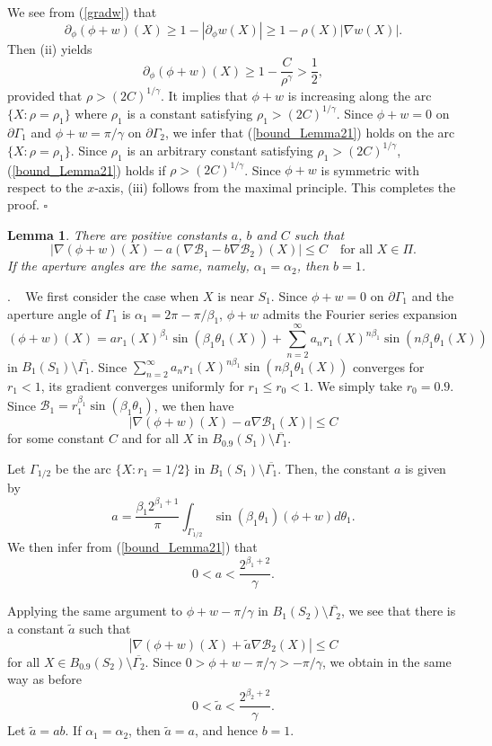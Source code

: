 \documentclass[11pt,a4paper]{article}
\numberwithin{equation}{section}
\newtheorem{lem}[thm]{Lemma}
\newcommand{\qed}{\hfill \ensuremath{\square}}
\newcommand{\pf}{\noindent {\sl Proof}. \ }
\newcommand{\p}{\partial}
\newcommand{\eqnref}[1]{(\ref {#1})}
\newcommand{\Bcal}{\mathcal{B}}
\newcommand{\Ga}{\alpha}
\newcommand{\Gb}{\beta}
\newcommand{\Gf}{\phi}
\newcommand{\Gg}{\gamma}
\newcommand{\Gt}{\theta}
\newcommand{\Gr}{\rho}
\newcommand{\GG}{\Gamma}
\newcommand{\beq}{\begin{equation}}
\newcommand{\eeq}{\end{equation}}
\begin{document}
We see from \eqnref{gradw} that
$$
\p_\Gf \left(\Gf + w \right)(X) \geq 1 - |\p_\Gf w(X)| \geq 1- {\Gr(X)} | \nabla w(X)|  .
$$
Then (ii) yields
$$
\p_\Gf \left(\Gf + w \right)(X) \geq  1 - \frac{C}{\Gr^{\Gg}} > \frac 1 2,
$$
provided that $\Gr >(2C)^{1/\Gg}$. It implies that $\Gf + w$ is increasing along the arc $\{ X:\Gr=\Gr_1 \}$ where $\Gr_1$ is a constant satisfying $\Gr_1> (2C)^{1/\Gg}$. Since $\Gf + w = 0$ on $\p\GG_1$ and $\Gf + w = \pi/\Gg$ on $\p\GG_2$, we infer that \eqnref{bound_Lemma21} holds
on the arc $\{X: \Gr=\Gr_1 \}$. Since $\Gr_1$ is an arbitrary constant satisfying $\Gr_1> (2C)^{1/\Gg}$, \eqnref{bound_Lemma21} holds if $\Gr>(2C)^{1/\Gg}$.  Since $\Gf + w$ is symmetric with respect to the $x$-axis, (iii) follows from the maximal principle. This completes the proof.
\qed


\begin{lem}\label{lemma_A}
There are positive constants $a$, $b$ and $C$ such that
\beq\label{lemAest}
|\nabla \left( \Gf + w\right)(X)  - a \left(\nabla \Bcal_1 - b \nabla \Bcal_2 \right)(X) | \le C \quad \mbox{for all } X \in \Pi.
\eeq
If the aperture angles are the same, namely, $\Ga_1 = \Ga_2$, then $b=1$.
\end{lem}

\pf
We first consider the case when $X$ is near $S_1$. Since $\Gf + w=0$ on $\p \GG_1$ and the aperture angle of $\GG_1$ is $\Ga_1=2\pi-\pi/\Gb_1$, $\Gf+w$ admits the Fourier series expansion
$$
( \Gf + w ) (X)=a r_1(X)^{\Gb_1} \sin (\Gb_1 \Gt_1 (X)) + \sum_{n=2}^{\infty} a_n r_1(X)^{n\Gb_1} \sin(n\Gb_1 \Gt_1(X))
$$
in $B_1(S_1)\setminus {\overline {\GG_1}}$. Since $\sum_{n=2}^{\infty} a_n r_1(X)^{n\Gb_1} \sin(n\Gb_1 \Gt_1(X))$ converges for $r_1 <1$, its gradient converges uniformly for $r_1 \le r_0 <1$. We simply take $r_0=0.9$. Since $\Bcal_1 = r_1^{\Gb_1} \sin (\Gb_1 \Gt_1)$, we then have
\beq\label{estone}
|\nabla ( \Gf + w )(X) - a \nabla \Bcal_1 (X)| \le C
\eeq
for some constant $C$ and for all $X$ in $B_{0.9}(S_1)\setminus \overline {\GG_1}$.


Let $\GG_{1/2}$ be the arc $\{X:r_1=1/2\}$ in $B_1(S_1)\setminus {\overline {\GG_1}}$. Then, the constant $a$ is given by
$$
a = \frac{\Gb_1 2^{\Gb_1+1}}{\pi} \int_{\GG_{1/2}} \sin(\Gb_1 \Gt_1) ( \Gf + w) d\Gt_1.
$$
We then infer from \eqnref{bound_Lemma21} that
\beq
0< a < \frac{2^{\Gb_1+2}}{\Gg}.
\eeq


Applying the same argument to $\Gf + w - \pi/\Gg$ in $B_1(S_2)\setminus {\overline {\GG_2}}$, we see that there is a constant $\tilde{a}$ such that
\beq\label{esttwo}
|\nabla \left( \Gf + w \right)(X) + \tilde{a} \nabla \Bcal_2 (X) | \le C
\eeq
for all $X \in B_{0.9}(S_2) \setminus {\overline {\GG_2}}$. Since  $ 0 > \Gf + w - \pi/\Gg > -\pi/\Gg$, we obtain in the same way as before
\beq
0< \tilde{a}  < \frac{2^{\Gb_2+2}}{\Gg}.
\eeq
Let $\tilde{a}=ab$. If $\Ga_1=\Ga_2$, then $\tilde{a}=a$, and hence $b=1$.
\end{document}
